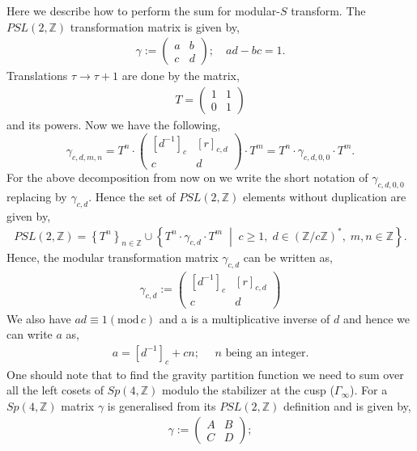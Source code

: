 \documentclass[12 pt]{article}
\begin{document}
\noindent
Here we describe how to perform the sum for modular-$S$ transform. The $PSL(2,\mathbb{Z})$ transformation matrix is given by, \begin{align}
    \gamma:=\begin{pmatrix}
    a & b\\
    c& d
\end{pmatrix}; \,\,\,\,\,\,ad-bc=1.
\end{align}
Translations $\tau \to \tau + 1$ are done by the matrix,
\begin{align}
   T =
\begin{pmatrix}
1 & 1 \\
0 & 1
\end{pmatrix}
\label{3.11r}
\end{align}
and its powers. Now we have the following,
\[
\gamma_{c,d,m,n} = T^n \cdot
\begin{pmatrix}
[d^{-1}]_c &[r]_{c,d} \\
c & d
\end{pmatrix}
\cdot T^m
= T^n \cdot \gamma_{c,d,0,0} \cdot T^m.
\]
For the above decomposition from now on we write the short notation of $\gamma_{c,d,0,0}$ replacing by $\gamma_{c,d}$.
Hence the set of $PSL(2,\mathbb{Z})$ elements without duplication are given by,
\begin{align}
PSL(2,\mathbb{Z}) = \left\{ T^n \right\}_{n\in \mathbb{Z}}
\cup
\left\{ T^n \cdot \gamma_{c,d} \cdot T^m
\;\middle|\;
c \geq 1,\; d \in (\mathbb{Z}/c\mathbb{Z})^*,\; m,n \in \mathbb{Z}
\right\}.
\end{align}
Hence, the modular transformation matrix $\gamma_{c,d}$ can be written as,
\begin{align}
    \gamma_{c,d}:=\begin{pmatrix}
        [d^{-1}]_c &[r]_{c,d} \\
c & d
    \end{pmatrix}
\end{align}
We also have $ad\equiv1 (\text{mod}  \,c)$ and a is a multiplicative inverse of $d$ and hence we can write $a$ as,
\begin{align}
    a=[d^{-1}]_{c}+cn ;\,\,\,\,\,\,\,\, \text{$n$ being an integer.}
\end{align}
One should note that to find the gravity partition function we need to sum over all the left cosets of $Sp(4,\mathbb{Z})$ modulo the stabilizer at the cusp ($\Gamma_{\infty}$). For a $Sp(4,\mathbb{Z})$ matrix $\gamma$ is generalised from its $PSL(2,\mathbb{Z})$ definition and is given by,
    \begin{align}
    \gamma:=\begin{pmatrix}
    A & B\\
    C& D
\end{pmatrix};
\end{align}
\end{document}
